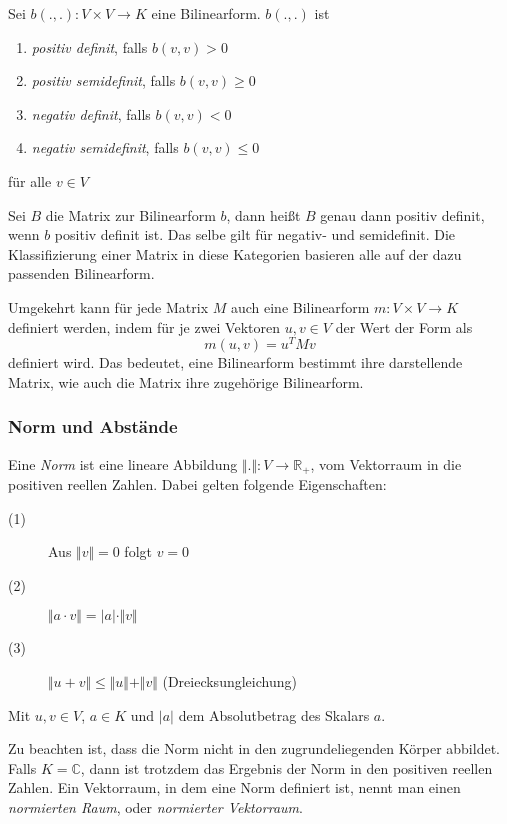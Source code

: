 \begin{definition}
Sei $b(.,.) : V\times V \longrightarrow K$ eine Bilinearform. $b(.,.)$ ist

\begin{enumerate}
\item \textsl{positiv definit}, falls $b(v,v)>0$
\item \textsl{positiv semidefinit}, falls $b(v,v)\ge 0$
\item \textsl{negativ definit}, falls $b(v,v) <0$
\item \textsl{negativ semidefinit}, falls $b(v,v)\le 0$
\end{enumerate}
für alle $v\in V $
\end{definition}

Sei $B$ die Matrix zur Bilinearform $b$, dann heißt $B$ genau dann positiv definit, wenn $b$ positiv definit ist. Das selbe gilt für negativ- und semidefinit. Die Klassifizierung einer Matrix in diese Kategorien basieren alle auf der dazu passenden Bilinearform. 

Umgekehrt kann für jede Matrix $M$ auch eine Bilinearform $m :V\times V \longrightarrow K$ definiert werden, indem für je zwei Vektoren $u,v\in V$ der Wert der Form als 
\[
m(u,v) = u^T M v
\]
definiert wird. Das bedeutet, eine Bilinearform bestimmt ihre darstellende Matrix, wie auch die Matrix ihre zugehörige Bilinearform.

\subsubsection{Norm und Abstände}

\begin{definition}
Eine \textsl{Norm} ist eine lineare Abbildung $\Vert . \Vert : V \longrightarrow \mathbb{R}_+$, vom Vektorraum in die positiven reellen Zahlen. Dabei gelten folgende Eigenschaften:
\begin{description}
\item[(1)] Aus $\Vert v\Vert = 0$ folgt $v=0$
\item[(2)] $\Vert a\cdot v\Vert = \vert a\vert \cdot \Vert v\Vert$
\item[(3)] $\Vert u+v\Vert \le \Vert u\Vert + \Vert v\Vert $ (Dreiecksungleichung)
\end{description}
Mit $u,v\in V$, $a\in K$ und $\vert a\vert$ dem Absolutbetrag des Skalars $a$.
\end{definition}
Zu beachten ist, dass die Norm nicht in den zugrundeliegenden Körper abbildet. Falls $K=\mathbb{C}$, dann ist trotzdem das Ergebnis der Norm in den positiven reellen Zahlen. Ein Vektorraum, in dem eine Norm definiert ist, nennt man einen \textsl{normierten Raum}, oder \textsl{normierter Vektorraum}.

